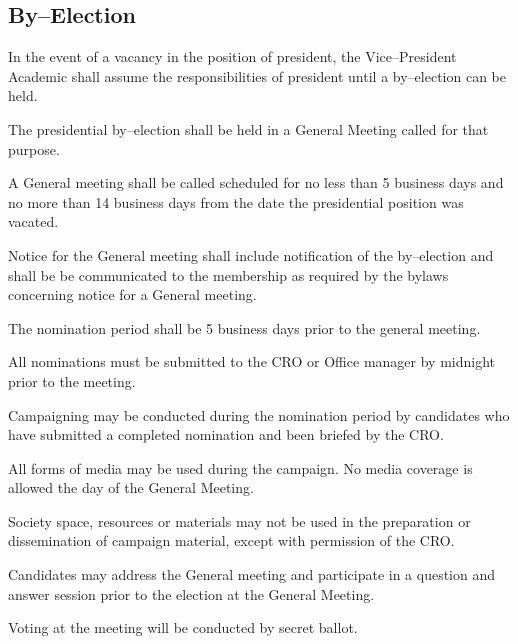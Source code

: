\subsection {By--Election}
\begin{longenum}[ label*=\thesubsection.\arabic*., align=left]
	\item In the event of a vacancy in the position of president, the Vice--President Academic shall assume the responsibilities of president until a by--election can be held.
	\item The presidential by--election shall be held in a General Meeting called for that purpose.
	\item A General meeting shall be called scheduled for no less than 5 business days and no more than 14 business days from the date the presidential position was vacated. 
	\item Notice for the General meeting shall include notification of the by--election and shall be be communicated to the membership as required by the bylaws concerning notice for a General meeting.
	\item The nomination period shall be 5 business days prior to the general meeting.
	\item All nominations must be submitted to the CRO or Office manager by midnight prior to the meeting.
	\item Campaigning may be conducted during the nomination period by candidates who have submitted a completed nomination and been briefed by the CRO.
	\item All forms of media may be used during the campaign. No media coverage is allowed the day of the General Meeting.  
	\item Society space, resources or materials may not be used in the preparation or dissemination of campaign material, except with permission of the CRO.
	\item Candidates may address the General meeting and participate in a question and answer session prior to the election at the General Meeting.
	\item Voting at the meeting will be conducted by secret ballot.

\end{longenum}
